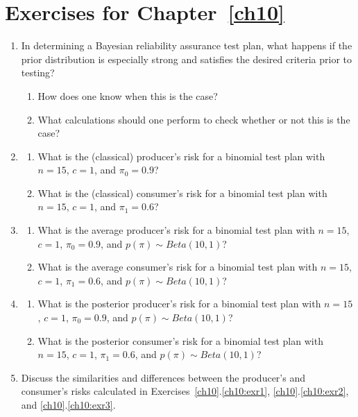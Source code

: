 \documentclass {book}
\begin{document}
\section{Exercises for Chapter~\ref{ch10}}
\begin{enumerate}[\ref{ch10}.1]
\item In determining a Bayesian reliability assurance test plan,
what happens if the prior distribution is especially strong and
satisfies the desired criteria prior to testing?
\begin{enumerate} \item How does one know when this is the case? \item
What calculations should one perform to check whether or not this
is the case?\end{enumerate}

\item \label{ch10:exr1} \begin{enumerate} \item What is the
(classical) producer's risk for a binomial test plan with $n =
15$, $c = 1$, and $\pi_0 = 0.9$? \item What is the (classical)
consumer's risk for a binomial test plan with $n = 15$, $c = 1$,
and $\pi_1 = 0.6$?
\end{enumerate}

\item \label{ch10:exr2} \begin{enumerate} \item What is the
average producer's risk for a binomial test plan with $n = 15$, $c
= 1$, $\pi_0 = 0.9$, and $p(\pi) \sim Beta(10,1)$? \item What is
the average consumer's risk for a binomial test plan with $n =
15$, $c = 1$, $\pi_1 = 0.6$, and $p(\pi) \sim Beta(10,1)$?
\end{enumerate}

\item \label{ch10:exr3} \begin{enumerate} \item What is the
posterior producer's risk for a binomial test plan with $n = 15$,
$c = 1$, $\pi_0 = 0.9$, and $p(\pi) \sim Beta(10,1)$? \item What
is the posterior consumer's risk for a binomial test plan with $n
= 15$, $c = 1$, $\pi_1 = 0.6$, and $p(\pi) \sim Beta(10,1)$?
\end{enumerate}

\item Discuss the similarities and differences between the
producer's and consumer's risks calculated in
Exercises~\ref{ch10}.\ref{ch10:exr1}, \ref{ch10}.\ref{ch10:exr2},
and \ref{ch10}.\ref{ch10:exr3}.


\end{enumerate}
\end{document}
